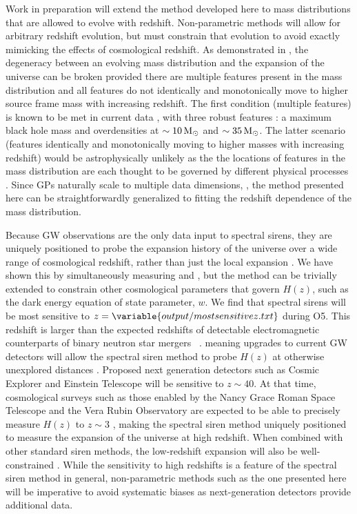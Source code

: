 \documentclass[]{aastex631}
\begin{document}
Work in preparation will extend the method developed here to mass distributions that are allowed to evolve with redshift.
Non-parametric methods will allow for arbitrary redshift evolution, but must constrain that evolution to avoid exactly mimicking the effects of cosmological redshift.
As demonstrated in \citet{ezquiaga_spectral_2022}, the degeneracy between an evolving mass distribution and the expansion of the universe can be broken provided there are multiple features present in the mass distribution and all features do not identically and monotonically move to higher source frame mass with increasing redshift.
The first condition (multiple features) is known to be met in current data \citep{abbott_population_2023}, with three robust features \citep{farah_things_2023}: a maximum black hole mass and overdensities at $\sim10\,\text{M}_{\odot}$ and $\sim35\,\text{M}_{\odot}$.
The latter scenario (features identically and monotonically moving to higher masses with increasing redshift) would be astrophysically unlikely as the the locations of features in the mass distribution are each thought to be governed by different physical processes \citep{mapelli_binary_2020}.
Since \aclp{GP} naturally scale to multiple data dimensions, \citep{rasmussen_gaussian_2006}, the method presented here can be straightforwardly generalized to fitting the redshift dependence of the mass distribution. 

Because \ac{GW} observations are the only data input to spectral sirens, they are uniquely positioned to probe the expansion history of the universe over a wide range of cosmological redshift, rather than just the local expansion \Ho.
We have shown this by simultaneously measuring \Omm{} and \Ho{}, but the method can be trivially extended to constrain other cosmological parameters that govern $H(z)$, such as the dark energy equation of state parameter, $w$. 
We find that spectral sirens will be most sensitive to $z=\variable{output/mostsensitivez.txt}$ during \acf{O5}.
This redshift is larger than the expected redshifts of detectable electromagnetic counterparts of binary neutron star mergers ~\citep{kiendrebeogo_updated_2023}.
meaning  upgrades to current \ac{GW} detectors will allow the spectral siren method to probe $H(z)$ at otherwise unexplored distances . 
Proposed next generation  detectors such as Cosmic Explorer and Einstein Telescope will be sensitive to $z\sim40$.
At that time, cosmological surveys such as those enabled by the Nancy Grace Roman Space Telescope and the Vera Rubin Observatory are expected to be able to precisely measure $H(z)$ to $z\sim3$ \citep{spergel_wide-field_2015}, making the spectral siren method uniquely positioned to measure the expansion of the universe at high redshift.
When combined with other standard siren methods, the low-redshift expansion will also be well-constrained \citep{Chen:2024gdn}.
While the sensitivity to high redshifts is a feature of the spectral siren method in general, non-parametric methods such as the one presented here will be imperative to avoid systematic biases as next-generation detectors provide additional data. 
\end{document}
